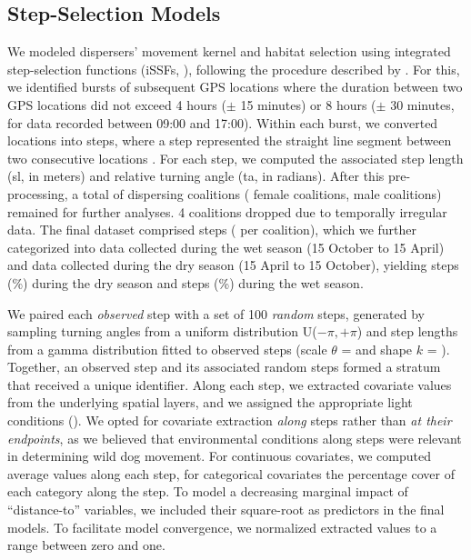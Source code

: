\documentclass[../FinalThesis.tex]{subfiles}
\begin{document}
\subsection{Step-Selection Models}

We modeled dispersers' movement kernel and habitat selection using integrated
step-selection functions (iSSFs, \citealp{Fortin.2005, Avgar.2016}), following
the procedure described by \citet{Muff.2020}. For this, we identified bursts of
subsequent GPS locations where the duration between two GPS locations did not
exceed 4 hours (\(\pm\) 15 minutes) or 8 hours (\(\pm\) 30 minutes, for data
recorded between 09:00 and 17:00). Within each burst, we converted locations
into steps, where a step represented the straight line segment between two
consecutive locations \citep{Turchin.1998}. For each step, we computed the
associated step length (sl, in meters) and relative turning angle (ta, in
radians). After this pre-processing, a total of 
dispersing coalitions ( female coalitions,
 male coalitions) remained for further analyses.
4 coalitions dropped due to temporally irregular data. The final dataset
comprised  steps
( per coalition), which we further
categorized into data collected during the wet season (15 October to 15 April)
and data collected during the dry season (15 April to 15 October), yielding
 steps
(\%) during the dry season and
 steps
(\%) during the wet season.

We paired each \textit{observed} step with a set of 100 \textit{random} steps,
generated by sampling turning angles from  a uniform distribution U(\(-\pi,
+\pi\)) and step lengths from a gamma distribution fitted to observed steps
(scale \(\theta\) =  and shape \(k\) =
). Together, an observed step and its
associated random steps formed a stratum that received a unique identifier.
Along each step, we extracted covariate values from the underlying spatial
layers, and we assigned the appropriate light conditions ().
We opted for covariate extraction \textit{along} steps rather than \textit{at
their endpoints}, as we believed that environmental conditions along steps were
relevant in determining wild dog movement. For continuous covariates, we
computed average values along each step, for categorical covariates the
percentage cover of each category along the step. To model a decreasing marginal
impact of ``distance-to'' variables, we included their square-root as predictors
in the final models. To facilitate model convergence, we normalized extracted
values to a range between zero and one.
\end{document}
